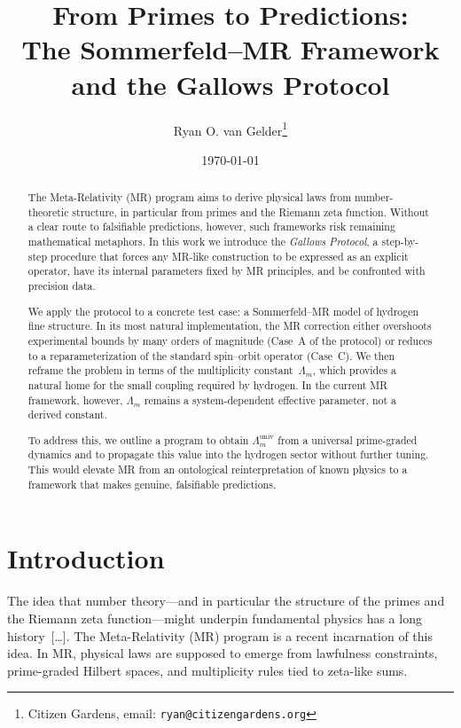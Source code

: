 \documentclass[11pt,a4paper]{article}
\title{
  From Primes to Predictions:\\[0.3em]
  \large The Sommerfeld--MR Framework and the Gallows Protocol
}
\author{
  Ryan O. van Gelder\thanks{Citizen Gardens, email: \texttt{ryan@citizengardens.org}}
}
\date{\today}
\newcommand{\LambdaM}{\Lambda_{m}}
\newcommand{\LambdaMuniv}{\Lambda_{m}^{\mathrm{univ}}}
\begin{document}

\maketitle

\begin{abstract}
The Meta-Relativity (MR) program aims to derive physical laws from number-theoretic structure, in particular from primes and the Riemann zeta function. Without a clear route to falsifiable predictions, however, such frameworks risk remaining mathematical metaphors. In this work we introduce the \emph{Gallows Protocol}, a step-by-step procedure that forces any MR-like construction to be expressed as an explicit operator, have its internal parameters fixed by MR principles, and be confronted with precision data.

We apply the protocol to a concrete test case: a Sommerfeld--MR model of hydrogen fine structure. In its most natural implementation, the MR correction either overshoots experimental bounds by many orders of magnitude (Case~A of the protocol) or reduces to a reparameterization of the standard spin--orbit operator (Case~C). We then reframe the problem in terms of the multiplicity constant~$\LambdaM$, which provides a natural home for the small coupling required by hydrogen. In the current MR framework, however, $\LambdaM$ remains a system-dependent effective parameter, not a derived constant.

To address this, we outline a program to obtain $\LambdaMuniv$ from a universal prime-graded dynamics and to propagate this value into the hydrogen sector without further tuning. This would elevate MR from an ontological reinterpretation of known physics to a framework that makes genuine, falsifiable predictions.
\end{abstract}

\tableofcontents

\section{Introduction}

The idea that number theory---and in particular the structure of the primes and the Riemann zeta function---might underpin fundamental physics has a long history~[\dots]. The Meta-Relativity  (MR) program is a recent incarnation of this idea. In MR, physical laws are supposed to emerge from lawfulness constraints, prime-graded Hilbert spaces, and multiplicity rules tied to zeta-like sums.
\end{document}
